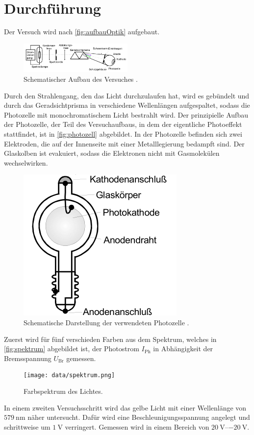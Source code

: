 \section{Durchführung}
\label{sec:Durchführung}

Der Versuch wird nach \autoref{fig:aufbauOptik} aufgebaut.
\begin{figure}[H]
    \centering
    \includegraphics[width = 0.5\textwidth]{data/optischerTeil.png}
    \caption{Schematischer Aufbau des Versuches \cite{Anleitung500}.}
    \label{fig:aufbauOptik}
\end{figure}

\noindent
Durch den Strahlengang, den das Licht durchzulaufen hat, wird es gebündelt und durch das Geradsichtprisma in verschiedene Wellenlängen aufgespaltet, sodass
die Photozelle mit monochromatischem Licht bestrahlt wird. Der prinzipielle Aufbau der Photozelle, der Teil des Versuchaufbaus, in dem der eigentliche Photoeffekt
stattfindet, ist in \autoref{fig:photozell} abgebildet. In der Photozelle befinden sich zwei Elektroden, die auf der Innenseite 
mit einer Metalllegierung bedampft sind. Der Glaskolben ist evakuiert, sodass die Elektronen nicht mit Gasmolekülen wechselwirken.
\begin{figure}[H]
    \centering
    \includegraphics{data/photozelle.png}
    \caption{Schematische Darstellung der verwendeten Photozelle \cite{Anleitung500}.}
    \label{fig:photozell}
\end{figure}

\noindent
Zuerst wird für fünf verschieden Farben aus dem Spektrum, welches in \autoref{fig:spektrum} abgebildet ist, der Photostrom $I_{\text{Ph}}$ in Abhängigkeit der
Bremsspannung $U_{\text{Br}}$ gemessen.

\begin{figure}[H]
    \centering
    \texttt{[image: data/spektrum.png]}
    \caption{Farbspektrum des Lichtes.}
    \label{fig:spektrum}
\end{figure}

\noindent
In einem zweiten Versuchsschritt wird das gelbe Licht mit einer Wellenlänge von $\SI{579}{\nano\metre}$ näher untersucht. Dafür wird eine Beschleunigungsspannung
angelegt und schrittweise um $\SI{1}{\volt}$ verringert. Gemessen wird in einem Bereich von $\SIrange{20}{-20}{\volt}$.